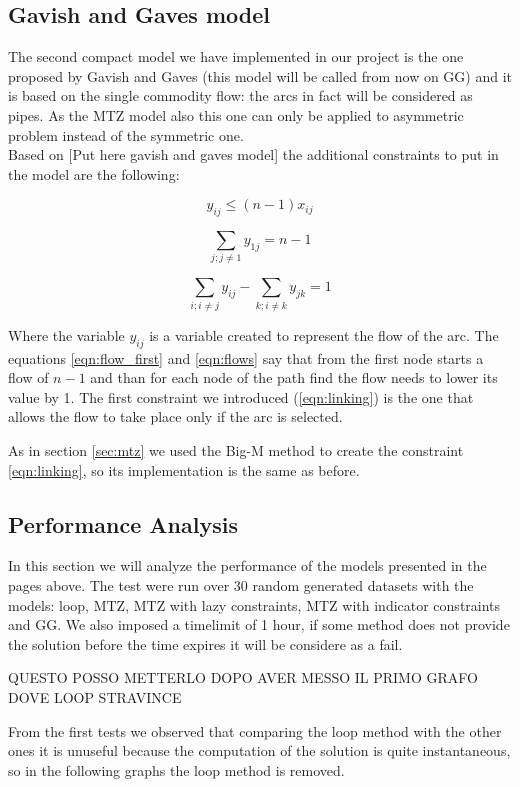 \subsection{Gavish and Gaves model}
The second compact model we have implemented in our project is the one proposed by Gavish and Gaves (this model will be called from now on GG) and it is based on the single commodity flow: the arcs in fact will be considered as pipes. As the MTZ model also this one can only be applied to asymmetric problem instead of the symmetric one.\\
Based on [Put here gavish and gaves model] the additional constraints to put in the model are the following:

\begin{equation}
	\label{eqn:linking}
	y_{ij}\le (n-1)x_{ij}
\end{equation}

\begin{equation}
	\label{eqn:flow_first}
	\sum_{j;j\not=1}y_{1j}=n-1
\end{equation}

\begin{equation}
	\label{eqn:flows}
	\sum_{i;i\not=j}y_{ij}-\sum_{k;i\not=k}y_{jk}=1
\end{equation}

Where the variable $y_{ij}$ is a variable created to represent the flow of the arc. The equations \ref{eqn:flow_first} and \ref{eqn:flows} say that from the first node starts a flow of $n-1$ and than for each node of the path find the flow needs to lower its value by 1. The first constraint we introduced (\ref{eqn:linking}) is the one that allows the flow to take place only if the arc is selected.

As in section \ref{sec:mtz} we used the Big-M method to create the constraint \ref{eqn:linking}, so its implementation is the same as before.

\subsection{Performance Analysis}
In this section we will analyze the performance of the models presented in the pages above. The test were run over 30 random generated datasets with the models: loop, MTZ, MTZ with lazy constraints, MTZ with indicator constraints and GG. We also imposed a timelimit of 1 hour, if some method does not provide the solution before the time expires it will be considere as a fail.

QUESTO POSSO METTERLO DOPO AVER MESSO IL PRIMO GRAFO DOVE LOOP STRAVINCE


From the first tests we observed that comparing the loop method with the other ones it is unuseful because the computation of the solution is quite instantaneous, so in the following graphs the loop method is removed.